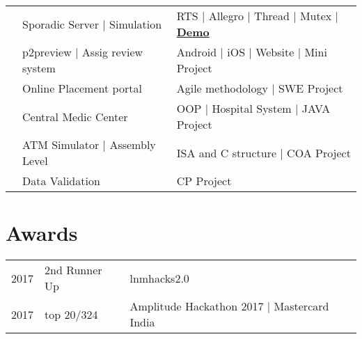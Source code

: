 \documentclass[a4paper]{deedy-resume} %
\begin{document}
\begin{minipage}[t]{0.66\textwidth}
    \sectionspace %
    
    
    \sectionspace %
    
    \begin{tabular}{rll}
    \textbullet{}    & Sporadic Server | Simulation & RTS | Allegro | Thread | Mutex | \href{https://www.youtube.com/watch?v=Uk_JrIUiWAw}{\bf Demo}\\ 
    \textbullet{}    & p2preview | Assig review system & Android | iOS | Website | Mini Project\\
    \textbullet{}	 & Online Placement portal & Agile methodology | SWE Project\\
    \textbullet{}    & Central Medic Center & OOP | Hospital System | JAVA Project\\
    \textbullet{}	 & ATM Simulator | Assembly Level & ISA and C structure | COA Project\\
    \textbullet{}	 & Data Validation & CP Project\\
    \end{tabular}
    
    \sectionspace %
    
    
    \section{Awards} 
    
    \begin{tabular}{rll}
    2017	 & 2nd Runner Up & lnmhacks2.0\\
    2017	 & top 20/324 & Amplitude Hackathon 2017 | Mastercard India \\
    \end{tabular}
    
    \sectionspace %
    
    

\end{minipage}
\end{document}
